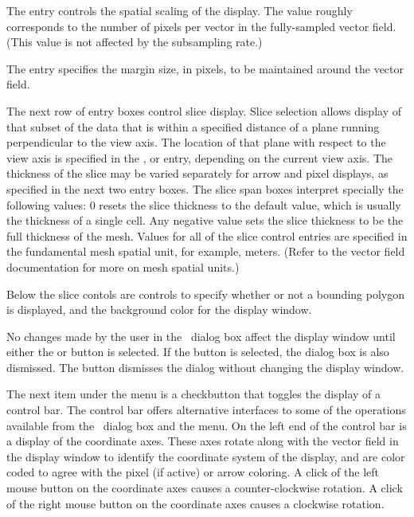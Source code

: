 The  entry controls the spatial scaling of
the display.  The value roughly corresponds to the number of pixels per
vector in the fully-sampled vector field.  (This value is not affected
by the subsampling rate.)

The  entry specifies the margin size, in pixels, to be
maintained around the vector field.

The next row of entry boxes control slice
display.  Slice selection allows display of that subset of the data
that is within a specified distance of a plane running perpendicular
to the view axis.  The location of that plane with respect to the view
axis is specified in the ,  or
 entry, depending on the current view axis.
The thickness of the slice may be varied separately for arrow and
pixel displays, as specified in the next two entry boxes.  The slice
span boxes interpret specially the following values: 0 resets the
slice thickness to the default value, which is usually the thickness
of a single cell.  Any negative value sets the slice thickness to be
the full thickness of the mesh.  Values for all of the slice control
entries are specified in the fundamental mesh spatial unit, for
example, meters.  (Refer to the vector field
documentation for more on mesh spatial units.)

Below the slice contols are controls to specify whether or not a
bounding polygon is displayed, and the background
color for the display window.

No changes made by the user in the {}\
dialog box affect the display window until either the
 or  button is selected.  If the  button is
selected, the dialog box is also dismissed.  The {\btn{Close}}
button dismisses the dialog without changing the display window.

The next item under the  menu is a checkbutton that
toggles the display of a control bar.  The control bar offers
alternative interfaces to some of the operations available from the
\btn{Options\pipe Configure\ldots}\ dialog box and the \btn{View} menu.
On the left end of the control bar is a display of the coordinate axes.
These axes rotate along with the vector field in the display window to
identify the coordinate system of the display, and are color coded to
agree with the pixel (if active) or arrow coloring.  A click of the left
mouse button on the coordinate axes causes a counter-clockwise rotation.
A click of the right mouse button on the coordinate axes causes a
clockwise rotation.

